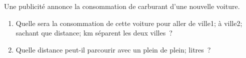 \documentclass[exercice]{thedocument}%
\begin{document}
%
Une publicité annonce la consommation de carburant d'une nouvelle voiture.
\vskip10pt
\begin{enumerate}
    \item Quelle sera la consommation de cette voiture pour aller de
    \<ville1; à \<ville2; sachant que \<distance; km séparent les deux villes~?
    \item Quelle distance peut-il parcourir avec un plein de \<plein; litres~?
\end{enumerate}
\end{document}
